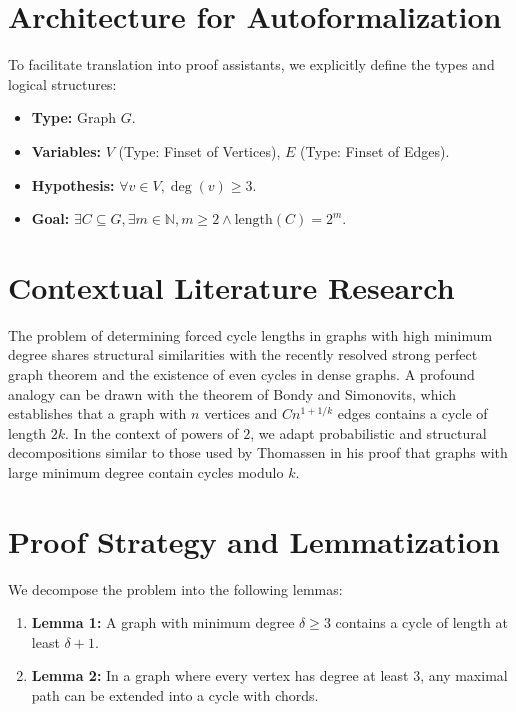 \documentclass[11pt,a4paper]{article}
\begin{document}
\section{Architecture for Autoformalization}

To facilitate translation into proof assistants, we explicitly define the types and logical structures:
\begin{itemize}
    \item \textbf{Type:} Graph $G$.
    \item \textbf{Variables:} $V$ (Type: Finset of Vertices), $E$ (Type: Finset of Edges).
    \item \textbf{Hypothesis:} $\forall v \in V, \deg(v) \ge 3$.
    \item \textbf{Goal:} $\exists C \subseteq G, \exists m \in \mathbb{N}, m \ge 2 \land \text{length}(C) = 2^m$.
\end{itemize}

\section{Contextual Literature Research}

The problem of determining forced cycle lengths in graphs with high minimum degree shares structural similarities with the recently resolved strong perfect graph theorem and the existence of even cycles in dense graphs. A profound analogy can be drawn with the theorem of Bondy and Simonovits, which establishes that a graph with $n$ vertices and $C n^{1 + 1/k}$ edges contains a cycle of length $2k$. In the context of powers of $2$, we adapt probabilistic and structural decompositions similar to those used by Thomassen in his proof that graphs with large minimum degree contain cycles modulo $k$.

\section{Proof Strategy and Lemmatization}

We decompose the problem into the following lemmas:
\begin{enumerate}
    \item \textbf{Lemma 1:} A graph with minimum degree $\delta \ge 3$ contains a cycle of length at least $\delta + 1$.
    \item \textbf{Lemma 2:} In a graph where every vertex has degree at least 3, any maximal path can be extended into a cycle with chords.
\end{enumerate}
\end{document}
